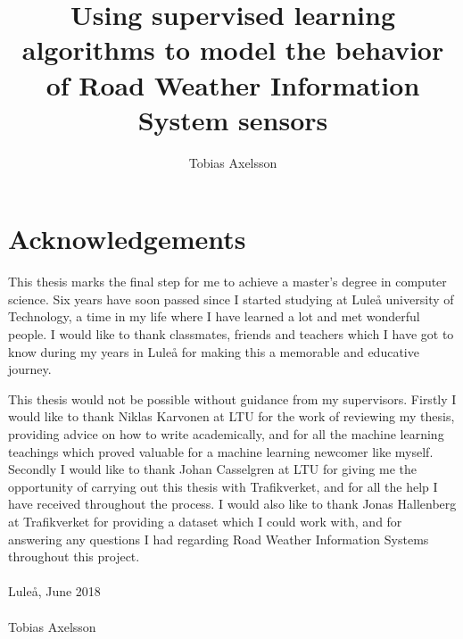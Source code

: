 \documentclass[oneside, 11pt]{report} %
\title{Using supervised learning algorithms to model the behavior of Road Weather Information System sensors}
\author{Tobias Axelsson}
\begin{document}

\chapter*{Acknowledgements}
	This thesis marks the final step for me to achieve a master's degree in computer science. Six years have soon passed since I started studying at Luleå university of Technology, a time in my life where I have learned a lot and met wonderful people. I would like to thank classmates, friends and teachers which I have got to know during my years in Luleå for making this a memorable and educative journey. 

	This thesis would not be possible without guidance from my supervisors. Firstly I would like to thank Niklas Karvonen at LTU for the work of reviewing my thesis, providing advice on how to write academically, and for all the machine learning teachings which proved valuable for a machine learning newcomer like myself. Secondly I would like to thank Johan Casselgren at LTU for giving me the opportunity of carrying out this thesis with Trafikverket, and for all the help I have received throughout the process. I would also like to thank Jonas Hallenberg at Trafikverket for providing a dataset which I could work with, and for answering any questions I had regarding Road Weather Information Systems throughout this project.\\\\
	Luleå, June 2018\\\\
	Tobias Axelsson
\end{document}
